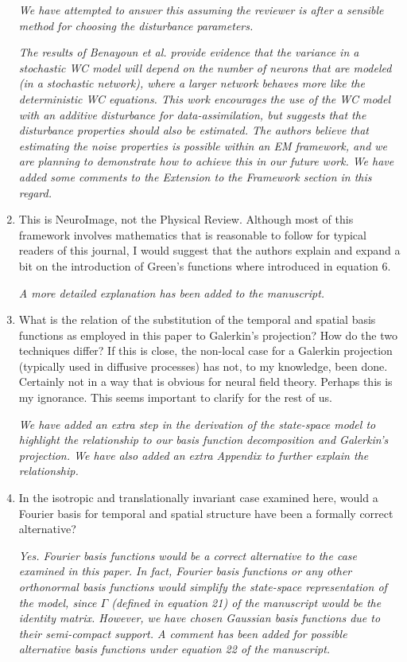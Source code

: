 \documentclass{article}
\begin{document}
\begin{enumerate}
\emph{We have attempted to answer this assuming the reviewer is after a sensible method for choosing the disturbance parameters.}

\emph{The results of Benayoun et al. provide evidence that the variance in a stochastic WC model will depend on the number of neurons that are modeled (in a stochastic network), where a larger network behaves more like the deterministic WC equations. This work encourages the use of the WC model with an additive disturbance for data-assimilation, but suggests that the disturbance properties should also be estimated. The authors believe that estimating the noise properties is possible within an EM framework, and we are planning to demonstrate how to achieve this in our future work. We have added some comments to the Extension to the Framework section in this regard.}

\item This is NeuroImage, not the Physical Review. Although most of this framework involves mathematics that is reasonable to follow for typical readers of this journal, I would suggest that the authors explain and expand a bit on the introduction of Green's functions where introduced in equation 6.

\emph{A more detailed explanation has been added to the manuscript.}

\item What is the relation of the substitution of the temporal and spatial basis functions as employed in this paper to Galerkin's projection? How do the two techniques differ? If this is close, the non-local case for a Galerkin projection (typically used in diffusive processes) has not, to my knowledge, been done. Certainly not in a way that is obvious for neural field theory. Perhaps this is my ignorance. This seems important to clarify for the rest of us.

\emph{We have added an extra step in the derivation of the state-space model to highlight the relationship to our basis function decomposition and Galerkin's projection. We have also added an extra Appendix to further explain the relationship.}

\item In the isotropic and translationally invariant case examined here, would a Fourier basis for temporal and spatial structure have been a formally correct alternative?

\emph{Yes. Fourier basis functions would be a correct alternative to the case examined in this paper. In fact, Fourier basis functions or any other orthonormal basis functions would simplify the state-space representation of the model, since $\Gamma$ (defined in equation 21) of the manuscript would be the identity matrix. However, we have chosen Gaussian basis functions due to their semi-compact support. A comment has been added for possible alternative basis functions under equation 22 of the manuscript.}


\end{enumerate}
\end{document}
